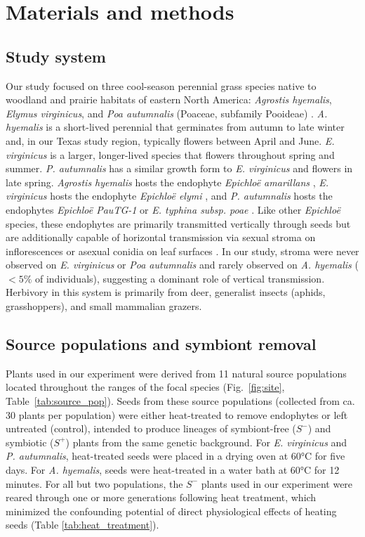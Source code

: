 \documentclass[12pt]{article}\usepackage[]{graphicx}\usepackage[dvipsnames]{xcolor}
\begin{document}
\section*{Materials and methods}
\subsection*{Study system}
Our study focused on three cool-season perennial grass species native to woodland and prairie habitats of eastern North America: \emph{Agrostis hyemalis}, \emph{Elymus virginicus}, and \emph{Poa autumnalis} (Poaceae, subfamily Pooideae) \citep{shaw2011guide}.
\emph{A. hyemalis} is a short-lived perennial that germinates from autumn to late winter and, in our Texas study region, typically flowers between April and June. 
\emph{E. virginicus} is a larger, longer-lived species that flowers throughout spring and summer. 
\emph{P. autumnalis} has a similar growth form to \emph{E. virginicus} and flowers in late spring. 
\emph{Agrostis hyemalis} hosts the endophyte \emph{Epichloë amarillans} \citep{white1994endophyte}, \emph{E. virginicus} hosts the endophyte \emph{Epichloë elymi} \citep{liu2023fungi}, and \emph{P. autumnalis} hosts the endophytes \emph{Epichloë PauTG-1} or \emph{E. typhina subsp. poae} \citep{gundel2020simulated}.
Like other \emph{Epichloë} species, these endophytes are primarily transmitted vertically through seeds but are additionally capable of horizontal transmission via sexual stroma on inflorescences or asexual conidia on leaf surfaces \citep{clay2002evolutionary, gundel2020simulated,leuchtmann2014nomenclatural}. 
In our study, stroma were never observed on \emph{E. virginicus} or \emph{Poa autumnalis} and rarely observed on \emph{A. hyemalis} ($<5\%$ of individuals), suggesting a dominant role of vertical transmission.
Herbivory in this system is primarily from deer, generalist insects (aphids, grasshoppers), and small mammalian grazers. 

\subsection*{Source populations and symbiont removal}
Plants used in our experiment were derived from 11 natural source populations located throughout the ranges of the focal species (Fig.~\ref{fig:site}, Table~\ref{tab:source_pop}). 
Seeds from these source populations (collected from ca. 30 plants per population) were either heat-treated to remove endophytes or left untreated (control), intended to produce lineages of symbiont-free ($S^-$) and symbiotic ($S^+$) plants from the same genetic background. 
For \emph{E. virginicus} and \emph{P. autumnalis}, heat-treated seeds were placed in a drying oven at 60°C for five days. 
For \emph{A. hyemalis}, seeds were heat-treated in a water bath at 60°C for 12 minutes.
For all but two populations, the $S^-$ plants used in our experiment were reared through one or more generations following heat treatment, which minimized the confounding potential of direct physiological effects of heating seeds (Table \ref{tab:heat_treatment}). 
\end{document}
